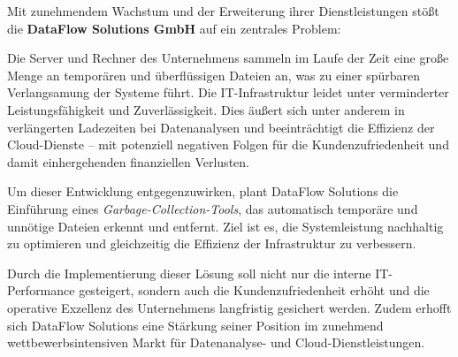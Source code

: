 Mit zunehmendem Wachstum und der Erweiterung ihrer Dienstleistungen stößt die \textbf{DataFlow Solutions GmbH} auf ein zentrales Problem:

Die Server und Rechner des Unternehmens sammeln im Laufe der Zeit eine große Menge an temporären und überflüssigen Dateien an, was zu einer spürbaren Verlangsamung der Systeme führt. Die IT-Infrastruktur leidet unter verminderter Leistungsfähigkeit und Zuverlässigkeit. Dies äußert sich unter anderem in verlängerten Ladezeiten bei Datenanalysen und beeinträchtigt die Effizienz der Cloud-Dienste – mit potenziell negativen Folgen für die Kundenzufriedenheit und damit einhergehenden finanziellen Verlusten.

Um dieser Entwicklung entgegenzuwirken, plant DataFlow Solutions die Einführung eines \textit{Garbage-Collection-Tools}, das automatisch temporäre und unnötige Dateien erkennt und entfernt. Ziel ist es, die Systemleistung nachhaltig zu optimieren und gleichzeitig die Effizienz der Infrastruktur zu verbessern.

Durch die Implementierung dieser Lösung soll nicht nur die interne IT-Performance gesteigert, sondern auch die Kundenzufriedenheit erhöht und die operative Exzellenz des Unternehmens langfristig gesichert werden. Zudem erhofft sich DataFlow Solutions eine Stärkung seiner Position im zunehmend wettbewerbsintensiven Markt für Datenanalyse- und Cloud-Dienstleistungen.
